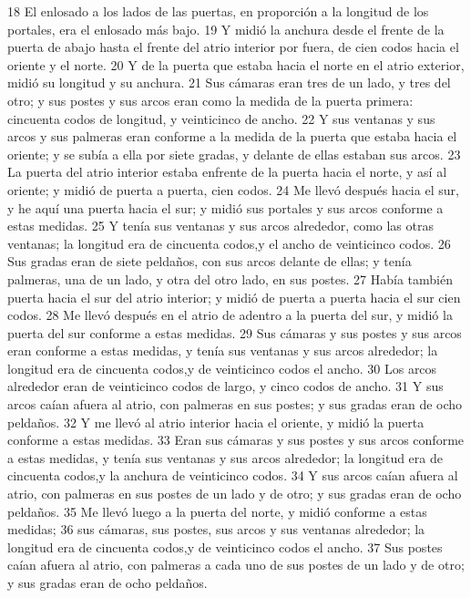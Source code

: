 18 El enlosado a los lados de las puertas, en proporción a la longitud de los portales, era el enlosado más bajo.
19 Y midió la anchura desde el frente de la puerta de abajo hasta el frente del atrio interior por fuera, de cien codos hacia el oriente y el norte.
20 Y de la puerta que estaba hacia el norte en el atrio exterior, midió su longitud y su anchura.
21 Sus cámaras eran tres de un lado, y tres del otro; y sus postes y sus arcos eran como la medida de la puerta primera: cincuenta codos de longitud, y veinticinco de ancho.
22 Y sus ventanas y sus arcos y sus palmeras eran conforme a la medida de la puerta que estaba hacia el oriente; y se subía a ella por siete gradas, y delante de ellas estaban sus arcos. 
23 La puerta del atrio interior estaba enfrente de la puerta hacia el norte, y así al oriente; y midió de puerta a puerta, cien codos.
24 Me llevó después hacia el sur, y he aquí una puerta hacia el sur; y midió sus portales y sus arcos conforme a estas medidas.
25 Y tenía sus ventanas y sus arcos alrededor, como las otras ventanas; la longitud era de cincuenta codos,y el ancho de veinticinco codos.
26 Sus gradas eran de siete peldaños, con sus arcos delante de ellas; y tenía palmeras, una de un lado, y otra del otro lado, en sus postes.
27 Había también puerta hacia el sur del atrio interior; y midió de puerta a puerta hacia el sur cien codos.
28 Me llevó después en el atrio de adentro a la puerta del sur, y midió la puerta del sur conforme a estas medidas.
29 Sus cámaras y sus postes y sus arcos eran conforme a estas medidas, y tenía sus ventanas y sus arcos alrededor; la longitud era de cincuenta codos,y de veinticinco codos el ancho.
30 Los arcos alrededor eran de veinticinco codos de largo, y cinco codos de ancho.
31 Y sus arcos caían afuera al atrio, con palmeras en sus postes; y sus gradas eran de ocho peldaños.
32 Y me llevó al atrio interior hacia el oriente, y midió la puerta conforme a estas medidas.
33 Eran sus cámaras y sus postes y sus arcos conforme a estas medidas, y tenía sus ventanas y sus arcos alrededor; la longitud era de cincuenta codos,y la anchura de veinticinco codos.
34 Y sus arcos caían afuera al atrio, con palmeras en sus postes de un lado y de otro; y sus gradas eran de ocho peldaños.
35 Me llevó luego a la puerta del norte, y midió conforme a estas medidas;
36 sus cámaras, sus postes, sus arcos y sus ventanas alrededor; la longitud era de cincuenta codos,y de veinticinco codos el ancho.
37 Sus postes caían afuera al atrio, con palmeras a cada uno de sus postes de un lado y de otro; y sus gradas eran de ocho peldaños.
